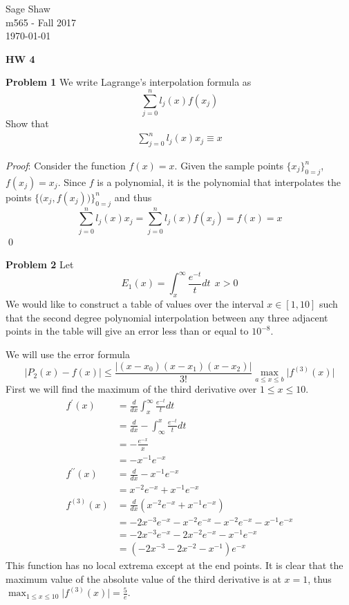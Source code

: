 \documentclass[12pt]{article}
\newcommand{\problem}[1]{\hspace{-4 ex} \large \textbf{Problem #1} }
\renewenvironment{proof}{\hspace{-4 ex} \emph{Proof}:}{\qed}
\begin{document}
	\thispagestyle{empty}
	
	\begin{flushright}
		Sage Shaw \\
		m565 - Fall 2017 \\
		\today
	\end{flushright}
	
{\large \textbf{HW 4}}\bigbreak

\singlespacing
\problem{1} We write Lagrange's interpolation formula as 
$$ \sum\limits_{j=0}^n l_j(x)f(x_j)  $$
Show that 
\begin{align}
	\sum\limits_{j=0}^n l_j(x)x_j \equiv x
\end{align}
	
	\doublespacing
	\begin{proof}
		Consider the function $f(x)=x$. Given the sample points $\{x_j\}_{0=j}^n$, $f(x_j)=x_j$. Since $f$ is a polynomial, it is the polynomial that interpolates the points $\Big \{ \big(x_j,f(x_j) \big) \Big\}_{0=j}^n$ and thus
		$$ \sum\limits_{j=0}^n l_j(x)x_j = \sum\limits_{j=0}^n l_j(x)f(x_j) = f(x) = x$$
	\end{proof}


\singlespacing
\problem{2} Let $$E_1(x) = \int_{x}^{\infty}\frac{e^{-t}}{t}dt \ \ x>0$$ 
We would like to construct a table of values over the interval $x \in [1,10]$ such that the second degree polynomial interpolation between any three adjacent points in the table will give an error less than or equal to $10^{-8}$.

	We will use the error formula
	$$
	\vert P_2(x) - f(x) \vert \leq \frac{\vert (x-x_0)(x-x_1)(x-x_2) \vert}{3!} \max_{a\leq x \leq b} \big\vert f^{(3)}(x) \big\vert
	$$
	First we will find the maximum of the third derivative over $1 \leq x \leq 10$.
	\begin{align*}
		f^{\prime}(x) & = \frac{d}{dx} \int_{x}^{\infty}\frac{e^{-t}}{t}dt \\
		& = \frac{d}{dx} -\int_{\infty}^{x}\frac{e^{-t}}{t}dt \\
		& = -\frac{e^{-x}}{x} \\
		& = -x^{-1}e^{-x} \\
		f^{\prime\prime}(x) & = \frac{d}{dx} -x^{-1}e^{-x} \\
		& = x^{-2} e^{-x} + x^{-1}e^{-x} \\
		f^{(3)}(x) & = \frac{d}{dx} (x^{-2} e^{-x} + x^{-1}e^{-x}) \\
		& = -2x^{-3}e^{-x} - x^{-2} e^{-x} - x^{-2} e^{-x} - x^{-1}e^{-x} \\
		& = -2x^{-3}e^{-x} - 2x^{-2} e^{-x} - x^{-1}e^{-x} \\
		& = (-2x^{-3} - 2x^{-2} - x^{-1}) e^{-x}
	\end{align*}
	This function has no local extrema except at the end points. It is clear that the maximum value of the absolute value of the third derivative is at $x=1$, thus $\max_{1\leq x \leq 10} \big\vert f^{(3)}(x) \big\vert = \tfrac{5}{e}$. \bigbreak
	
\end{document}
